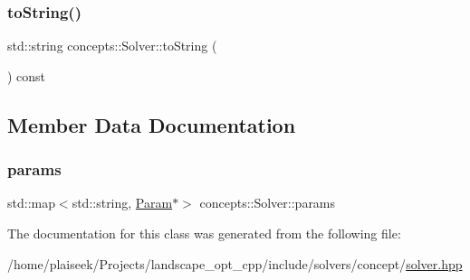 \subsubsection{\texorpdfstring{to\+String()}{toString()}}
{\footnotesize\ttfamily std\+::string concepts\+::\+Solver\+::to\+String (\begin{DoxyParamCaption}{ }\end{DoxyParamCaption}) const\hspace{0.3cm}{\ttfamily [inline]}}



\subsection{Member Data Documentation}
\mbox{\label{classconcepts_1_1_solver_a6b85828f79e693cba963f2fc98f7edd2}} 
\subsubsection{\texorpdfstring{params}{params}}
{\footnotesize\ttfamily std\+::map$<$std\+::string, \hyperlink{classconcepts_1_1_solver_1_1_param}{Param}$\ast$$>$ concepts\+::\+Solver\+::params\hspace{0.3cm}{\ttfamily [protected]}}



The documentation for this class was generated from the following file\+:\begin{DoxyCompactItemize}
\item 
/home/plaiseek/\+Projects/landscape\+\_\+opt\+\_\+cpp/include/solvers/concept/\hyperlink{solver_8hpp}{solver.\+hpp}\end{DoxyCompactItemize}
